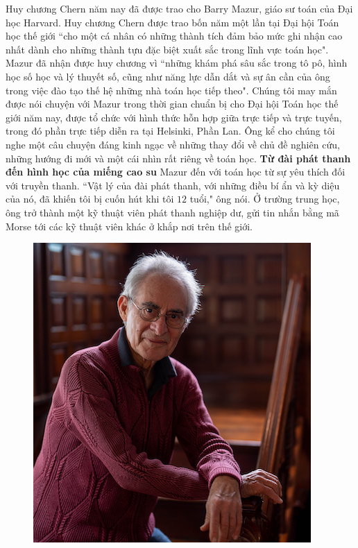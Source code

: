 \begin{multicols}{2}	
	Huy chương Chern năm nay đã được trao cho Barry Mazur, giáo sư toán của Đại học Harvard. Huy chương Chern được trao bốn năm một lần tại Đại hội Toán học thế giới ``cho một cá nhân có những thành tích đảm bảo mức ghi nhận cao nhất dành cho những thành tựu đặc biệt xuất sắc trong lĩnh vực toán học".
	\vskip 0.05cm
	Mazur đã nhận được huy chương vì ``những khám phá sâu sắc trong tô pô, hình học số học và lý thuyết số, cũng như năng lực dẫn dắt và sự ân cần của ông trong việc đào tạo thế hệ những nhà toán học tiếp theo".
	\vskip 0.05cm
	Chúng tôi may mắn được nói chuyện với Mazur trong thời gian chuẩn bị cho Đại hội Toán học thế giới năm nay, được tổ chức với hình thức hỗn hợp giữa trực tiếp và trực tuyến, trong đó phần trực tiếp diễn ra tại Helsinki, Phần Lan. Ông kể cho chúng tôi nghe một câu chuyện đáng kinh ngạc về những thay đổi về chủ đề nghiên cứu, những hướng đi mới và một cái nhìn rất riêng về toán học.
	\vskip 0.05cm
	\textbf{\color{duongvaotoanhoc}Từ đài phát thanh đến hình học của miếng cao su}
	\vskip 0.05cm
	Mazur đến với toán học từ sự yêu thích đối với truyền thanh. ``Vật lý của đài phát thanh, với những điều bí ẩn và kỳ diệu của nó, đã khiến tôi bị cuốn hút khi tôi $12$ tuổi," ông nói. Ở trường trung học, ông trở thành một kỹ thuật viên phát thanh nghiệp dư, gửi tin nhắn bằng mã Morse tới các kỹ thuật viên khác ở khắp nơi trên thế giới.
	\begin{figure}[H]
		\centering
		\vspace*{-5pt}
		\captionsetup{labelformat= empty, justification=centering}
		\includegraphics[width=0.8\linewidth]{1}

\end{figure}
\end{multicols}
